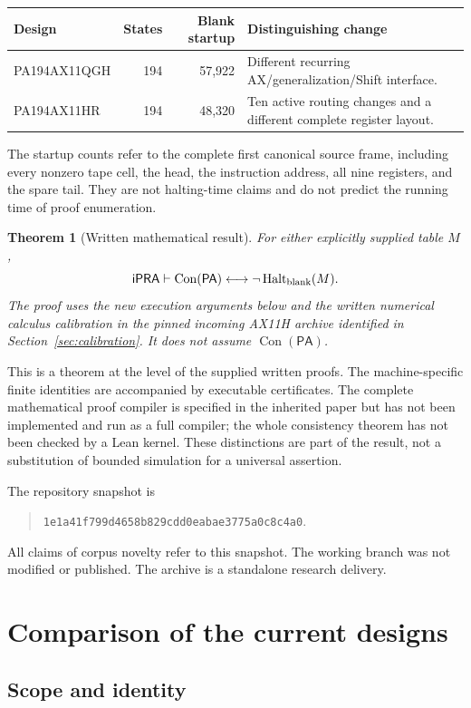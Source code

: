 \documentclass[11pt,letterpaper]{article}
\newcommand{\ipra}{\mathsf{iPRA}}
\newcommand{\PA}{\mathsf{PA}}
\newcommand{\Con}{\operatorname{Con}}
\newcommand{\Halt}{\operatorname{Halt}}
\newtheorem{theorem}{Theorem}[section]
\begin{document}
\begin{center}
\begin{tabularx}{\linewidth}{@{}lrrX@{}}
\toprule
Design & States & Blank startup & Distinguishing change\\
\midrule
PA194AX11QGH &194&57,922&Different recurring AX/generalization/Shift interface.\\
PA194AX11HR &194&48,320&Ten active routing changes and a different complete register layout.\\
\bottomrule
\end{tabularx}
\end{center}
The startup counts refer to the complete first canonical source frame,
including every nonzero tape cell, the head, the instruction address,
all nine registers, and the spare tail. They are not halting-time claims
and do not predict the running time of proof enumeration.

\begin{theorem}[Written mathematical result]
For either explicitly supplied table $M$,
\[
 \ipra\vdash\Con(\PA)\longleftrightarrow\neg\Halt_{\rm blank}(M).
\]
The proof uses the new execution arguments below and the written numerical
calculus calibration in the pinned incoming AX11H archive identified in
Section~\ref{sec:calibration}. It does not assume $\Con(\PA)$.
\end{theorem}

This is a theorem at the level of the supplied written proofs. The
machine-specific finite identities are accompanied by executable
certificates. The complete mathematical proof compiler is specified in the
inherited paper but has not been implemented and run as a full compiler;
the whole consistency theorem has not been checked by a Lean kernel.
These distinctions are part of the result, not a substitution of bounded
simulation for a universal assertion.

The repository snapshot is
\begin{quote}\small\nolinkurl{1e1a41f799d4658b829cdd0eabae3775a0c8c4a0}.\end{quote}
All claims of corpus novelty refer to this snapshot. The working branch was
not modified or published. The archive is a standalone research delivery.

\section{Comparison of the current designs}
\label{sec:comparison}

\subsection{Scope and identity}
\end{document}
